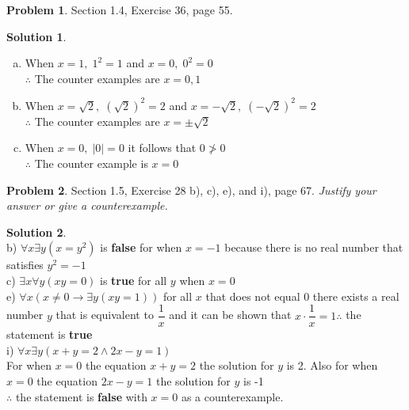 \documentclass{article}
\theoremstyle{definition}
\newtheorem{problem}{Problem}
\newtheorem*{solution}{Solution}
\begin{document}
\begin{problem} Section 1.4, Exercise 36, page 55.
\end{problem}
\begin{solution}
\begin{enumerate}[a)] \ \\
  \item When $x=1, \; 1^2 = 1$ and $x=0, \; 0^2 = 0$ \\
        $\therefore$ The counter examples are $x=0,1$
  \item When $x=\sqrt{2}, \; (\sqrt{2})^2 = 2$ and $x=-\sqrt{2}, \; (-\sqrt{2})^2 = 2$ \\
        $\therefore$ The counter examples are $x=\pm \sqrt{2}$
  \item When $x=0, \; |0| = 0$ it follows that $0 \ngtr 0$ \\
        $\therefore$ The counter example is $x=0$
\end{enumerate}
\end{solution}

\begin{problem} Section 1.5, Exercise 28 b), c), e), and i), page 67. 
\textsl{Justify your answer or give a counterexample.}
\end{problem}
\begin{solution} \ \\
b) $\forall x \exists y (x = y^2) $ is \textbf{false} for when $x = -1$ because there is no real number that satisfies $y^2 = -1$ \vspace{8pt} \\
c) $\exists x \forall y(xy = 0)$ is \textbf{true} for all $y$ when $ x=0$ \vspace{8pt}\\
e) $\forall x (x \neq 0 \rightarrow \exists y (xy = 1))$ for all $x$ that does not equal 0 there exists a real number $y$ that is equivalent to $\dfrac{1}{x}$ and it can be shown that $x \cdot \dfrac{1}{x} = 1 \therefore$ the statement is \textbf{true} \vspace{8pt}\\
i) $\forall x \exists y (x + y = 2 \land 2x - y = 1)$ \\
For when $x = 0$ the equation $x+y=2$ the solution for $y$ is 2. Also for when $x = 0$ the equation $2x-y=1$ the solution for $y$ is -1 \\
$\therefore$ the statement is \textbf{false} with $x=0$ as a counterexample.
\end{solution}
\end{document}
